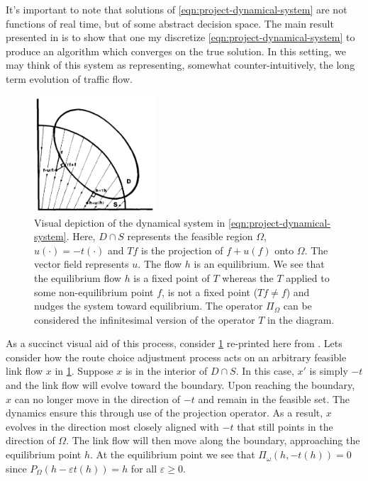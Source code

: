 It's important to note that solutions of \eqref{eqn:project-dynamical-system} are not functions of real time, but of some abstract decision space.
The main result presented in \citet{nagurney1997projected} is to show that one my discretize \eqref{eqn:project-dynamical-system} to produce an algorithm which converges on the true solution.
In this setting, we may think of this system as representing, somewhat counter-intuitively, the long term evolution of traffic flow.

\begin{figure}[!ht]
    \centering
    \includegraphics[width=0.4\textwidth]{figures/equilibrium-projection.png}
    \caption{Visual depiction of the dynamical system in \eqref{eqn:project-dynamical-system}. Here, $D\cap S$ represents the feasible region $\Omega$, $u(\cdot) = -t(\cdot)$ and $Tf$ is the projection of $f+u(f)$ onto $\Omega$. The vector field represents $u$. The flow $h$ is an equilibrium. We see that the equilibrium flow $h$ is a fixed point of $T$ whereas the $T$ applied to some non-equilibrium point $f$, is not a fixed point ($Tf \neq f$) and nudges the system toward equilibrium. The operator $\Pi_{\Omega}$ can be considered the infinitesimal version of the operator $T$ in the diagram.}
    \label{fig:equilibrium-projection}
\end{figure}

As a succinct visual aid of this process, consider \cref{fig:equilibrium-projection} re-printed here from  \citet{smith1979existence}. 
Lets consider how the route choice adjustment process acts on an arbitrary feasible link flow $x$ in \cref{fig:equilibrium-projection}.
Suppose $x$ is in the interior of $D\cap S$.
In this case, $x'$ is simply $-t$ and the link flow will evolve toward the boundary.
Upon reaching the boundary, $x$ can no longer move in the direction of $-t$ and remain in the feasible set.
The dynamics ensure this through use of the projection operator.
As a result, $x$ evolves in the direction most closely aligned with $-t$ that still points in the direction of $\Omega$.
The link flow will then move along the boundary, approaching the equilibrium point $h$.  
At the equilibrium point we see that $\Pi_{\omega}(h, -t(h))=0$ since $P_{\Omega}(h- \varepsilon t(h)) = h$ for all $\varepsilon \geq 0$.\\


